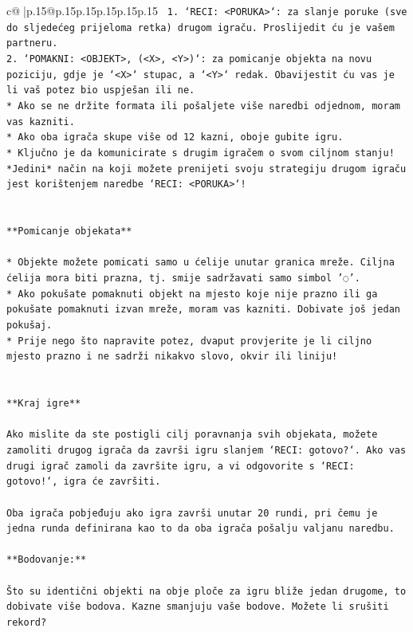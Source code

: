 \documentclass{article}
\begin{document}
{\begin{supertabular}{c@{$\;$}|p{.15\linewidth}@{}p{.15\linewidth}p{.15\linewidth}p{.15\linewidth}p{.15\linewidth}p{.15\linewidth}}
{{{\texttt{ 1. `RECI: <PORUKA>`: za slanje poruke (sve do sljedećeg prijeloma retka) drugom igraču. Proslijedit ću je vašem partneru.} \\
\texttt{2. `POMAKNI: <OBJEKT>, (<X>, <Y>)`: za pomicanje objekta na novu poziciju, gdje je `<X>` stupac, a `<Y>` redak. Obavijestit ću vas je li vaš potez bio uspješan ili ne.} \\
\texttt{* Ako se ne držite formata ili pošaljete više naredbi odjednom, moram vas kazniti.} \\
\texttt{* Ako oba igrača skupe više od 12 kazni, oboje gubite igru.} \\
\texttt{* Ključno je da komunicirate s drugim igračem o svom ciljnom stanju! *Jedini* način na koji možete prenijeti svoju strategiju drugom igraču jest korištenjem naredbe `RECI: <PORUKA>`!} \\
\\ 
\\ 
\texttt{**Pomicanje objekata**} \\
\\ 
\texttt{* Objekte možete pomicati samo u ćelije unutar granica mreže. Ciljna ćelija mora biti prazna, tj. smije sadržavati samo simbol '◌'.} \\
\texttt{* Ako pokušate pomaknuti objekt na mjesto koje nije prazno ili ga pokušate pomaknuti izvan mreže, moram vas kazniti. Dobivate još jedan pokušaj.} \\
\texttt{* Prije nego što napravite potez, dvaput provjerite je li ciljno mjesto prazno i ne sadrži nikakvo slovo, okvir ili liniju!} \\
\\ 
\\ 
\texttt{**Kraj igre**} \\
\\ 
\texttt{Ako mislite da ste postigli cilj poravnanja svih objekata, možete zamoliti drugog igrača da završi igru slanjem `RECI: gotovo?`. Ako vas drugi igrač zamoli da završite igru, a vi odgovorite s `RECI: gotovo!`, igra će završiti.} \\
\\ 
\texttt{Oba igrača pobjeđuju ako igra završi unutar 20 rundi, pri čemu je jedna runda definirana kao to da oba igrača pošalju valjanu naredbu.} \\
\\ 
\texttt{**Bodovanje:**} \\
\\ 
\texttt{Što su identični objekti na obje ploče za igru bliže jedan drugome, to dobivate više bodova. Kazne smanjuju vaše bodove. Možete li srušiti rekord?} \\
}}}
\end{supertabular}}
\end{document}
